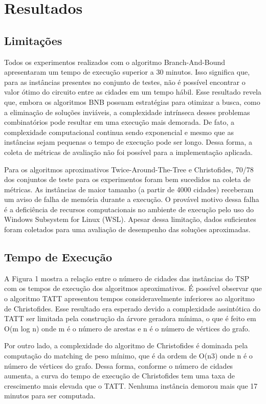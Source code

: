 \documentclass[12pt]{article}
\begin{document}
\section{Resultados}

\subsection{Limitações}

Todos os experimentos realizados com o algoritmo Branch-And-Bound apresentaram um tempo de execução superior a 30 minutos. Isso significa que, para as instâncias presentes no conjunto de testes, não é possível encontrar o valor ótimo do circuito entre as cidades em um tempo hábil. Esse resultado revela que, embora os algoritmos BNB possuam estratégias para otimizar a busca, como a eliminação de soluções inviáveis, a complexidade intrínseca desses problemas combinatórios pode resultar em uma execução mais demorada. De fato, a complexidade computacional continua sendo exponencial e mesmo que as instâncias sejam pequenas o tempo de execução pode ser longo. Dessa forma, a coleta de métricas de avaliação não foi possível para a implementação aplicada.

Para os algoritmos aproximativos Twice-Around-The-Tree e Christofides, 70/78 dos conjuntos de teste para os experimentos foram bem sucedidos na coleta de métricas. As instâncias de maior tamanho (a partir de 4000 cidades) receberam um aviso de falha de memória durante a execução. O provável motivo dessa falha é a deficiência de recursos computacionais no ambiente de execução pelo uso do Windows Subsystem for Linux (WSL). Apesar dessa limitação, dados suficientes foram coletados para uma avaliação de desempenho das soluções aproximadas.

\subsection{Tempo de Execução}

A Figura 1 mostra a relação entre o número de cidades das instâncias do TSP com os tempos de execução dos algoritmos aproximativos. É possível observar que o algoritmo TATT apresentou tempos consideravelmente inferiores ao algoritmo de Christofides. Esse resultado era esperado devido a complexidade assintótica do TATT ser limitada pela construção da árvore geradora mínima, o que é feito em O(m log n) onde m é o número de arestas e n é o número de vértices do grafo. 

Por outro lado, a complexidade do algoritmo de Christofides é dominada pela computação do matching de peso mínimo, que é da ordem de O(n3) onde n é o número de vértices do grafo. Dessa forma, conforme o número de cidades aumenta, a curva do tempo de execução de Christofides tem uma taxa de crescimento mais elevada que o TATT. Nenhuma instância demorou mais que 17 minutos para ser computada.
\end{document}
